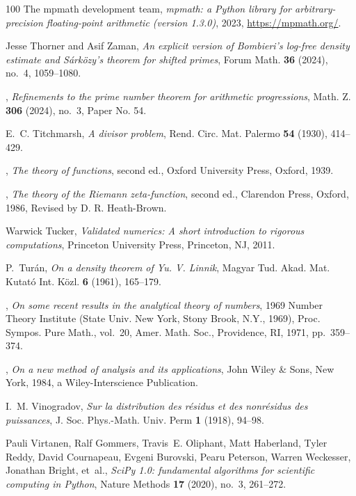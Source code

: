 \documentclass[11pt]{amsart}
\numberwithin{equation}{section}
\theoremstyle{plain}
\theoremstyle{definition}
\theoremstyle{remark}
\newcommand{\1}{\mathbf{1}}
\begin{document}
\begin{thebibliography}{100}
{The mpmath development team}, \emph{mpmath: a {P}ython library for
  arbitrary-precision floating-point arithmetic (version 1.3.0)}, 2023,
  \url{https://mpmath.org/}.

Jesse Thorner and Asif Zaman, \emph{An explicit version of {B}ombieri's
  log-free density estimate and {S}{\'a}rk{\"o}zy's theorem for shifted
  primes}, Forum Math. \textbf{36} (2024), no.~4, 1059--1080.

\bysame, \emph{Refinements to the prime number theorem for arithmetic
  progressions}, Math. Z. \textbf{306} (2024), no.~3, Paper No. 54.

E.~C. Titchmarsh, \emph{A divisor problem}, Rend. Circ. Mat. Palermo
  \textbf{54} (1930), 414--429.

\bysame, \emph{The theory of functions}, second ed., Oxford University Press,
  Oxford, 1939.

\bysame, \emph{The theory of the {R}iemann zeta-function}, second ed.,
  Clarendon Press, Oxford, 1986, Revised by D. R. Heath-Brown.

Warwick Tucker, \emph{Validated numerics: A short introduction to rigorous
  computations}, Princeton University Press, Princeton, NJ, 2011.

P.~Tur{\'a}n, \emph{On a density theorem of {Y}u. {V}. {L}innik}, Magyar Tud.
  Akad. Mat. Kutat{\'o} Int. K{\"o}zl. \textbf{6} (1961), 165--179. 

\bysame, \emph{On some recent results in the analytical theory of numbers},
  1969 Number Theory Institute (State Univ. New York, Stony Brook, N.Y., 1969),
  Proc. Sympos. Pure Math., vol.~20, Amer. Math. Soc., Providence, RI, 1971,
  pp.~359--374. 

\bysame, \emph{On a new method of analysis and its applications}, John Wiley \&
  Sons, New York, 1984, a Wiley-Interscience Publication.

I.~M. Vinogradov, \emph{Sur la distribution des r{\'e}sidus et des
  nonr{\'e}sidus des puissances}, J. Soc. Phys.-Math. Univ. Perm \textbf{1}
  (1918), 94--98.

Pauli Virtanen, Ralf Gommers, Travis~E. Oliphant, Matt Haberland, Tyler Reddy,
  David Cournapeau, Evgeni Burovski, Pearu Peterson, Warren Weckesser, Jonathan
  Bright, et~al., \emph{{SciPy} 1.0: fundamental algorithms for scientific
  computing in {P}ython}, Nature Methods \textbf{17} (2020), no.~3, 261--272.


\end{thebibliography}
\end{document}
